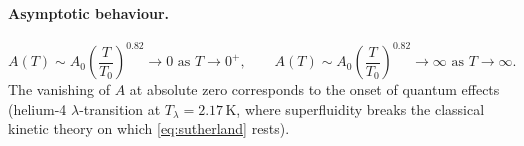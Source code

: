 \documentclass[12pt]{article}
\begin{document}
\paragraph{Asymptotic behaviour.}
\begin{equation}
  A(T) \sim A_0\left(\frac{T}{T_0}\right)^{0.82} \to 0 \text{ as } T\to 0^+,
  \qquad
  A(T) \sim A_0\left(\frac{T}{T_0}\right)^{0.82} \to \infty \text{ as } T\to\infty.
\end{equation}
The vanishing of $A$ at absolute zero corresponds to the onset of quantum effects
(helium-4 $\lambda$-transition at $T_\lambda = 2.17\,\mathrm{K}$, where superfluidity
breaks the classical kinetic theory on which \eqref{eq:sutherland} rests).


\end{document}
